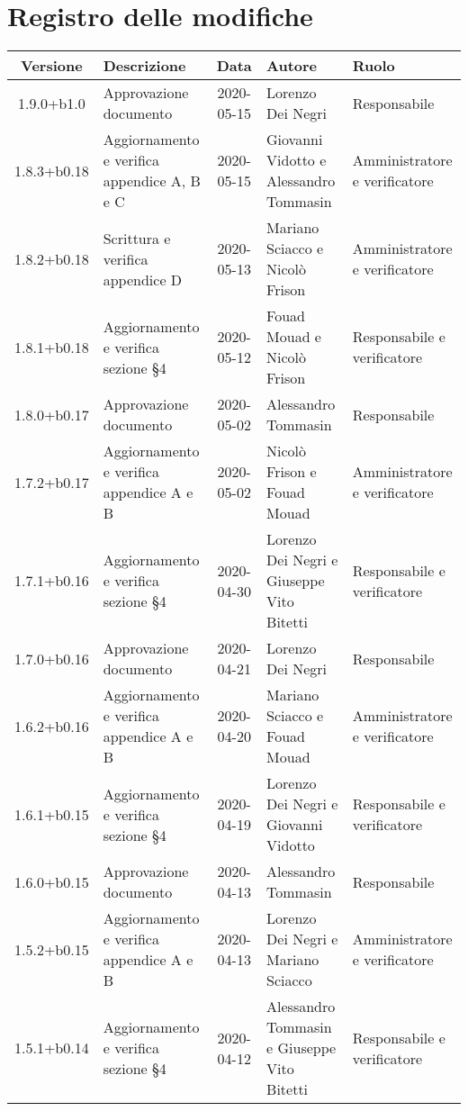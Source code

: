 \section*{Registro delle modifiche}

\begin{center}
	\begin{longtable}{|c|p{3.5cm}|c|p{3cm}|p{3cm}|}
	\hline
	\rowcolor{lighter-grayer}
	\textbf{Versione} & \textbf{Descrizione} & \textbf{Data} & \textbf{Autore} & \textbf{Ruolo} \\
	\hline
	\endfirsthead

	1.9.0+b1.0 & Approvazione documento & 2020-05-15 & Lorenzo Dei Negri & Responsabile \\
	\hline
	1.8.3+b0.18 & Aggiornamento e verifica appendice A, B e C & 2020-05-15 & Giovanni Vidotto e Alessandro Tommasin & Amministratore e verificatore \\
	\hline
	1.8.2+b0.18 & Scrittura e verifica appendice D & 2020-05-13 & Mariano Sciacco e Nicolò Frison & Amministratore e verificatore \\
	\hline
	1.8.1+b0.18 & Aggiornamento e verifica sezione \S4 & 2020-05-12 & Fouad Mouad e Nicolò Frison & Responsabile e verificatore \\
	\hline
	
	1.8.0+b0.17 & Approvazione documento & 2020-05-02 & Alessandro Tommasin & Responsabile \\
	\hline
	1.7.2+b0.17 & Aggiornamento e verifica appendice A e B & 2020-05-02 & Nicolò Frison e Fouad Mouad & Amministratore e verificatore \\
	\hline
	1.7.1+b0.16 & Aggiornamento e verifica sezione \S4 & 2020-04-30 & Lorenzo Dei Negri e Giuseppe Vito Bitetti & Responsabile e verificatore \\
	\hline
	
	1.7.0+b0.16 & Approvazione documento & 2020-04-21 & Lorenzo Dei Negri & Responsabile \\
	\hline
	1.6.2+b0.16 & Aggiornamento e verifica appendice A e B & 2020-04-20 & Mariano Sciacco e Fouad Mouad & Amministratore e verificatore \\
	\hline
	1.6.1+b0.15 & Aggiornamento e verifica sezione \S4 & 2020-04-19 & Lorenzo Dei Negri e Giovanni Vidotto & Responsabile e verificatore \\
	\hline
	
	1.6.0+b0.15 & Approvazione documento & 2020-04-13 & Alessandro Tommasin & Responsabile \\
	\hline
	1.5.2+b0.15 & Aggiornamento e verifica appendice A e B & 2020-04-13 & Lorenzo Dei Negri e Mariano Sciacco & Amministratore e verificatore \\
	\hline
	1.5.1+b0.14 & Aggiornamento e verifica sezione \S4 & 2020-04-12 & Alessandro Tommasin e Giuseppe Vito Bitetti & Responsabile e verificatore \\
	\hline
	

\end{longtable}
\end{center}
